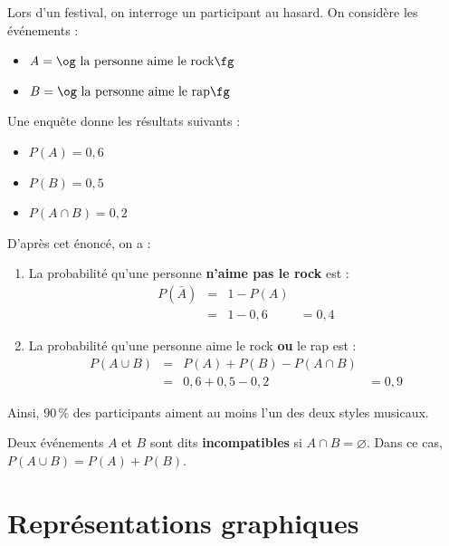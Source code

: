 Lors d'un festival, on interroge un participant au hasard. On considère les événements :

\begin{itemize}
	\item $A=\text{\og la personne aime le rock\fg}$
	\item $B=\text{\og la personne aime le rap\fg}$
\end{itemize}

Une enquête donne les résultats suivants :

\begin{itemize}
	\item $P(A)=0{,}6$
	\item $P(B)=0{,}5$
	\item $P(A\cap B)=0{,}2$
\end{itemize}

\ms

D'après cet énoncé, on a :

\begin{enumerate}
	\item La probabilité qu'une personne \textbf{n'aime pas le rock} est :\\
	      $$\begin{array}{rcll}
			      P(\bar{A}) & = & 1-P(A)  &        \\
			                 & = & 1-0{,}6 & =0{,}4
		      \end{array}$$
	\item La probabilité qu'une personne aime le rock \textbf{ou} le rap est :\\
	      $$\begin{array}{rcll}
			      P(A\cup B) & = & P(A)+P(B)-P(A\cap B) &          \\
			                 & = & 0{,}6+0{,}5-0{,}2    & =  0{,}9
		      \end{array}$$
\end{enumerate}

Ainsi, $90\,\%$ des participants aiment au moins l'un des deux styles musicaux.



Deux événements $A$ et $B$ sont dits \textbf{incompatibles} si $A \cap B = \varnothing$. Dans ce cas, $P(A \cup B) = P(A) + P(B)$.

\section{Représentations graphiques}

